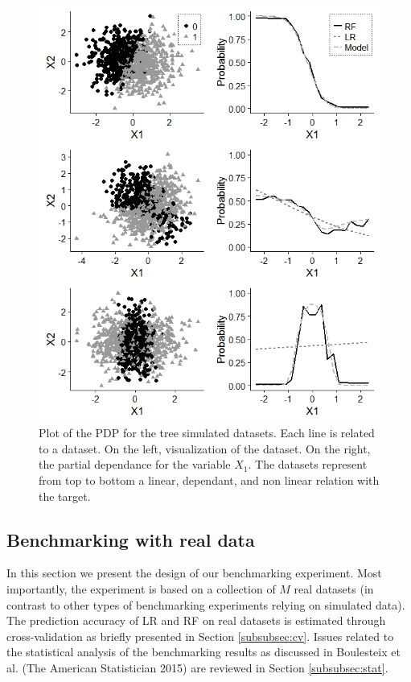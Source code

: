 \documentclass[12pt]{article}
\begin{document}
\begin{figure}[h]
	\centerline{
		\includegraphics[width=12cm]{Images/PDP/PdpBlackWhite.jpeg}}
	\caption{Plot of the PDP for the tree simulated datasets. Each line is related to a dataset. On the left, visualization of the dataset. On the right, the partial dependance for the variable $X_1$. The datasets represent from top to bottom a linear, dependant, and non linear relation with the target.}
	\label{fig:plotPDP}
\end{figure}


\newpage
\subsection{Benchmarking with real data}
In this section we present the design of our benchmarking experiment. Most importantly, the experiment is based on a collection of $M$ real datasets (in contrast to other types of benchmarking experiments relying on simulated data). The prediction accuracy of LR and RF on real datasets is estimated through cross-validation as briefly presented in Section \ref{subsubsec:cv}. Issues related to the statistical analysis of the benchmarking results as discussed in Boulesteix et al. (The American Statistician 2015) are reviewed in Section \ref{subsubsec:stat}. 
\end{document}
